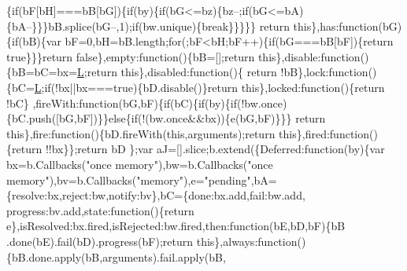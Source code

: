 \begin{DoxyCode}
      \{\textcolor{keywordflow}{if}(bF[bH]===bB[bG])\{\textcolor{keywordflow}{if}(by)\{\textcolor{keywordflow}{if}(bG<=bz)\{bz--;\textcolor{keywordflow}{if}(bG<=bA)\{bA--\}\}\}bB.splice(bG--,1);\textcolor{keywordflow}{if}(bw.unique)\{\textcolor{keywordflow}{break}\}\}\}\}\}\textcolor{keywordflow}{
      return} \textcolor{keyword}{this}\},has:\textcolor{keyword}{function}(bG)\{\textcolor{keywordflow}{if}(bB)\{var bF=0,bH=bB.length;\textcolor{keywordflow}{for}(;bF<bH;bF++)\{\textcolor{keywordflow}{if}(bG===bB[bF])\{\textcolor{keywordflow}{return} \textcolor{keyword}{true}\}\}\}\textcolor{keywordflow}{return}
       \textcolor{keyword}{false}\},empty:\textcolor{keyword}{function}()\{bB=[];\textcolor{keywordflow}{return} \textcolor{keyword}{this}\},disable:\textcolor{keyword}{function}()\{bB=bC=bx=\hyperlink{jquery_8js_a38ee4c0b5f4fe2a18d0c783af540d253}{L};\textcolor{keywordflow}{return} \textcolor{keyword}{this}\},disabled:\textcolor{keyword}{function}()\{\textcolor{keywordflow}{
      return} !bB\},lock:\textcolor{keyword}{function}()\{bC=\hyperlink{jquery_8js_a38ee4c0b5f4fe2a18d0c783af540d253}{L};\textcolor{keywordflow}{if}(!bx||bx===\textcolor{keyword}{true})\{bD.disable()\}\textcolor{keywordflow}{return} \textcolor{keyword}{this}\},locked:\textcolor{keyword}{function}()\{\textcolor{keywordflow}{return} !bC\}
      ,fireWith:\textcolor{keyword}{function}(bG,bF)\{\textcolor{keywordflow}{if}(bC)\{\textcolor{keywordflow}{if}(by)\{\textcolor{keywordflow}{if}(!bw.once)\{bC.push([bG,bF])\}\}\textcolor{keywordflow}{else}\{\textcolor{keywordflow}{if}(!(bw.once&&bx))\{e(bG,bF)\}\}\}\textcolor{keywordflow}{
      return} \textcolor{keyword}{this}\},fire:\textcolor{keyword}{function}()\{bD.fireWith(\textcolor{keyword}{this},arguments);\textcolor{keywordflow}{return} \textcolor{keyword}{this}\},fired:\textcolor{keyword}{function}()\{\textcolor{keywordflow}{return} !!bx\}\};\textcolor{keywordflow}{return} bD
      \};var aJ=[].slice;b.extend(\{Deferred:\textcolor{keyword}{function}(by)\{var bx=b.Callbacks(\textcolor{stringliteral}{"once memory"}),bw=b.Callbacks(\textcolor{stringliteral}{"once
       memory"}),bv=b.Callbacks(\textcolor{stringliteral}{"memory"}),e=\textcolor{stringliteral}{"pending"},bA=\{resolve:bx,reject:bw,notify:bv\},bC=\{done:bx.add,fail:bw.add,
      progress:bv.add,state:\textcolor{keyword}{function}()\{\textcolor{keywordflow}{return} e\},isResolved:bx.fired,isRejected:bw.fired,then:\textcolor{keyword}{function}(bE,bD,bF)\{bB
      .done(bE).fail(bD).progress(bF);\textcolor{keywordflow}{return} \textcolor{keyword}{this}\},always:\textcolor{keyword}{function}()\{bB.done.apply(bB,arguments).fail.apply(bB,

\end{DoxyCode}
